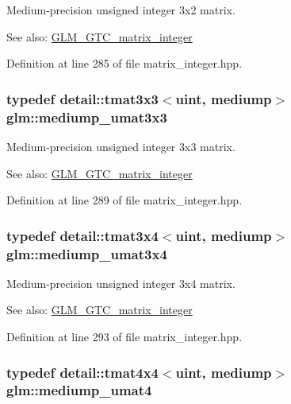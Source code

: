 Medium-precision unsigned integer 3x2 matrix. \begin{Desc}
\item[See also:]\hyperlink{group__gtc__matrix__integer}{GLM\_\-GTC\_\-matrix\_\-integer} \end{Desc}


Definition at line 285 of file matrix\_\-integer.hpp.\hypertarget{group__gtc__matrix__integer_g31a05e7b2a6a596bdc7ceeb5d9c10e1c}{
\subsubsection[mediump\_\-umat3x3]{\setlength{\rightskip}{0pt plus 5cm}typedef detail::tmat3x3$<$uint, mediump$>$ {\bf glm::mediump\_\-umat3x3}}}
\label{group__gtc__matrix__integer_g31a05e7b2a6a596bdc7ceeb5d9c10e1c}


Medium-precision unsigned integer 3x3 matrix. \begin{Desc}
\item[See also:]\hyperlink{group__gtc__matrix__integer}{GLM\_\-GTC\_\-matrix\_\-integer} \end{Desc}


Definition at line 289 of file matrix\_\-integer.hpp.\hypertarget{group__gtc__matrix__integer_g8113e067e1f327fac64cf9015c8c5431}{
\subsubsection[mediump\_\-umat3x4]{\setlength{\rightskip}{0pt plus 5cm}typedef detail::tmat3x4$<$uint, mediump$>$ {\bf glm::mediump\_\-umat3x4}}}
\label{group__gtc__matrix__integer_g8113e067e1f327fac64cf9015c8c5431}


Medium-precision unsigned integer 3x4 matrix. \begin{Desc}
\item[See also:]\hyperlink{group__gtc__matrix__integer}{GLM\_\-GTC\_\-matrix\_\-integer} \end{Desc}


Definition at line 293 of file matrix\_\-integer.hpp.\hypertarget{group__gtc__matrix__integer_gc82f1c426fbca1c4989f0985eb7a4358}{
\subsubsection[mediump\_\-umat4]{\setlength{\rightskip}{0pt plus 5cm}typedef detail::tmat4x4$<$uint, mediump$>$ {\bf glm::mediump\_\-umat4}}}
\label{group__gtc__matrix__integer_gc82f1c426fbca1c4989f0985eb7a4358}



